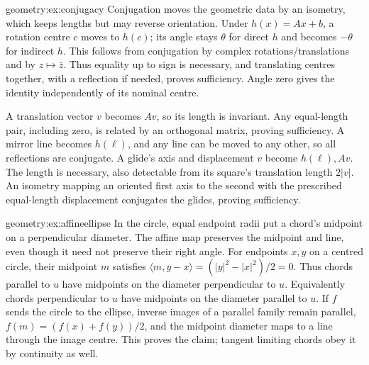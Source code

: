 \begin{solution}{geometry:ex:conjugacy}
\idea Conjugation moves the geometric data by an isometry, which keeps lengths but may reverse orientation.
\writeup Under $h(x)=Ax+b$, a rotation centre $c$ moves to $h(c)$; its angle stays $\theta$ for direct $h$ and becomes $-\theta$ for indirect $h$. This follows from conjugation by complex rotations/translations and by $z\mapsto\bar z$. Thus equality up to sign is necessary, and translating centres together, with a reflection if needed, proves sufficiency. Angle zero gives the identity independently of its nominal centre.

A translation vector $v$ becomes $Av$, so its length is invariant. Any equal-length pair, including zero, is related by an orthogonal matrix, proving sufficiency. A mirror line becomes $h(\ell)$, and any line can be moved to any other, so all reflections are conjugate. A glide's axis and displacement $v$ become $h(\ell),Av$. The length is necessary, also detectable from its square's translation length $2|v|$. An isometry mapping an oriented first axis to the second with the prescribed equal-length displacement conjugates the glides, proving sufficiency.
\end{solution}

\begin{solution}{geometry:ex:affineellipse}
\idea In the circle, equal endpoint radii put a chord's midpoint on a perpendicular diameter. The affine map preserves the midpoint and line, even though it need not preserve their right angle.
\writeup For endpoints $x,y$ on a centred circle, their midpoint $m$ satisfies
$\langle m,y-x\rangle=(|y|^2-|x|^2)/2=0$. Thus chords parallel to $u$ have midpoints on the diameter perpendicular to $u$. Equivalently chords perpendicular to $u$ have midpoints on the diameter parallel to $u$. If $f$ sends the circle to the ellipse, inverse images of a parallel family remain parallel, $f(m)=(f(x)+f(y))/2$, and the midpoint diameter maps to a line through the image centre. This proves the claim; tangent limiting chords obey it by continuity as well.
\end{solution}

